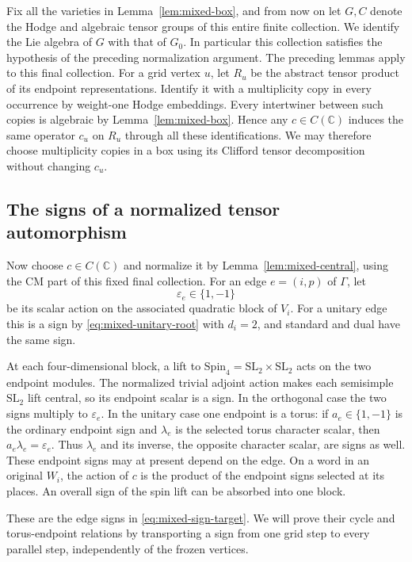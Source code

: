 \documentclass[11pt]{article}
\numberwithin{equation}{section}
\theoremstyle{definition}
\theoremstyle{remark}
\begin{document}
Fix all the varieties in Lemma~\ref{lem:mixed-box}, and from now on
let $G,C$ denote the Hodge and algebraic tensor groups of this entire
finite collection.  We identify the Lie algebra of $G$ with that
of $G_0$.  In particular this collection satisfies the hypothesis
of the preceding normalization argument.  The preceding lemmas apply
to this final collection.
For a grid vertex $u$, let $R_u$ be the abstract tensor product of
its endpoint representations.  Identify it with a multiplicity copy
in every occurrence by weight-one Hodge embeddings.  Every
intertwiner between such copies is algebraic by
Lemma~\ref{lem:mixed-box}.  Hence any $c\in C(\mathbb C)$ induces the
same operator $c_u$ on $R_u$ through all these identifications.
We may therefore choose multiplicity copies in a box using its
Clifford tensor decomposition without changing $c_u$.

\subsection{The signs of a normalized tensor automorphism}

Now choose $c\in C(\mathbb C)$ and normalize it by
Lemma~\ref{lem:mixed-central}, using the CM part of this fixed final
collection.  For an edge $e=(i,p)$ of $\Gamma$,
let
\[
 \varepsilon_e\in\{1,-1\}
\]
be its scalar action on the associated quadratic block of $V_i$.
For a unitary edge this is a sign by
\eqref{eq:mixed-unitary-root} with $d_i=2$, and standard and dual
have the same sign.

At each four-dimensional block, a lift to
$\mathrm{Spin}_4=\mathrm{SL}_2\times\mathrm{SL}_2$ acts on the
two endpoint modules.  The normalized trivial adjoint action makes
each semisimple $\mathrm{SL}_2$ lift central, so its endpoint scalar
is a sign.  In the orthogonal case the two signs multiply to
$\varepsilon_e$.  In the unitary case one endpoint is a torus:
if $a_e\in\{1,-1\}$ is the ordinary endpoint sign and $\lambda_e$
is the selected torus character scalar, then
$a_e\lambda_e=\varepsilon_e$.  Thus $\lambda_e$ and its inverse,
the opposite character scalar, are signs as well.
These endpoint signs may at present
depend on the edge.  On a word in an original $W_i$, the action of
$c$ is the product of the endpoint signs selected at its places.
An overall sign of the spin lift can be absorbed into one block.

These are the edge signs in \eqref{eq:mixed-sign-target}.  We will
prove their cycle and torus-endpoint relations by transporting a sign
from one grid step to every parallel step, independently of the frozen
vertices.
\end{document}
